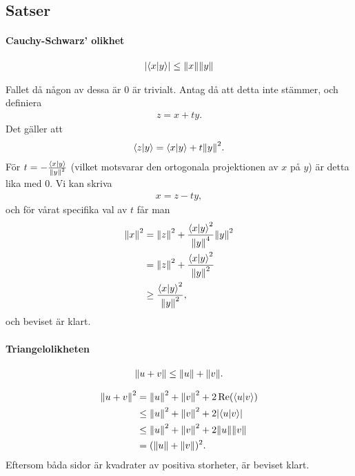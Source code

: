 \subsection{Satser}

\paragraph{Cauchy-Schwarz' olikhet}
\begin{align*}
	\abs{\bra{x}\ket{y}} \leq \norm{x}\norm{y}
\end{align*}

\proof
Fallet då någon av dessa är $0$ är trivialt. Antag då att detta inte stämmer, och definiera
\begin{align*}
	z = x + ty.
\end{align*}
Det gäller att
\begin{align*}
	\bra{z}\ket{y} = \bra{x}\ket{y} + t\norm{y}^{2}.
\end{align*}
För $t = -\frac{\bra{x}\ket{y}}{\norm{y}^{2}}$ (vilket motsvarar den ortogonala projektionen av $x$ på $y$) är detta lika med $0$. Vi kan skriva
\begin{align*}
	x = z - ty,
\end{align*}
och för vårat specifika val av $t$ får man
\begin{align*}
	\norm{x}^{2} &= \norm{z}^{2} + \frac{\bra{x}\ket{y}^{2}}{\norm{y}^{4}}\norm{y}^{2} \\
	             &= \norm{z}^{2} + \frac{\bra{x}\ket{y}^{2}}{\norm{y}^{2}} \\
	             &\geq \frac{\bra{x}\ket{y}^{2}}{\norm{y}^{2}},
\end{align*}
och beviset är klart.

\paragraph{Triangelolikheten}
\begin{align*}
	\norm{u + v} \leq \norm{u} + \norm{v}.
\end{align*}

\proof
\begin{align*}
	\norm{u + v}^{2} &= \norm{u}^{2} + \norm{v}^{2} + 2\Re(\bra{u}\ket{v}) \\
	                 &\leq \norm{u}^{2} + \norm{v}^{2} + 2\abs{\bra{u}\ket{v}} \\
	                 &\leq \norm{u}^{2} + \norm{v}^{2} + 2\norm{u}\norm{v} \\
	                 &= (\norm{u} + \norm{v})^{2}.
\end{align*}
Eftersom båda sidor är kvadrater av positiva storheter, är beviset klart.

